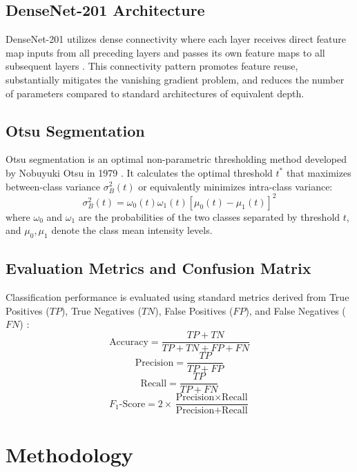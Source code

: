 \documentclass[conference]{IEEEtran}
\begin{document}
\subsection{DenseNet-201 Architecture}
DenseNet-201 utilizes dense connectivity where each layer receives direct feature map inputs from all preceding layers and passes its own feature maps to all subsequent layers \cite{ref9}. This connectivity pattern promotes feature reuse, substantially mitigates the vanishing gradient problem, and reduces the number of parameters compared to standard architectures of equivalent depth.

\subsection{Otsu Segmentation}
Otsu segmentation is an optimal non-parametric thresholding method developed by Nobuyuki Otsu in 1979 \cite{ref39}. It calculates the optimal threshold $t^*$ that maximizes between-class variance $\sigma_B^2(t)$ or equivalently minimizes intra-class variance:
\begin{equation}
\sigma_B^2(t) = \omega_0(t) \omega_1(t) \left[ \mu_0(t) - \mu_1(t) \right]^2
\end{equation}
where $\omega_0$ and $\omega_1$ are the probabilities of the two classes separated by threshold $t$, and $\mu_0, \mu_1$ denote the class mean intensity levels.

\subsection{Evaluation Metrics and Confusion Matrix}
Classification performance is evaluated using standard metrics derived from True Positives ($TP$), True Negatives ($TN$), False Positives ($FP$), and False Negatives ($FN$) \cite{ref28, ref29}:
\begin{equation}
\text{Accuracy} = \frac{TP + TN}{TP + TN + FP + FN}
\end{equation}
\begin{equation}
\text{Precision} = \frac{TP}{TP + FP}
\end{equation}
\begin{equation}
\text{Recall} = \frac{TP}{TP + FN}
\end{equation}
\begin{equation}
F_1\text{-Score} = 2 \times \frac{\text{Precision} \times \text{Recall}}{\text{Precision} + \text{Recall}}
\end{equation}

\section{Methodology}
\end{document}
